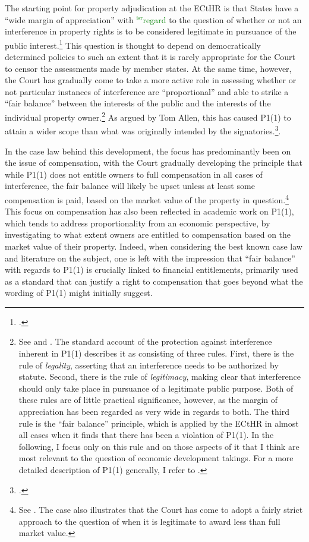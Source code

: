 \documentclass[12pt,a4paper]{book} %
\newcommand{\isr}[1]{\textcolor{green}{$^{\textrm{isr}}${#1}}}
\begin{document}
The starting point for property adjudication at the ECtHR is that States have a ``wide margin of appreciation'' with \isr{regard} to the question of whether or not an interference in property rights is to be considered legitimate in pursuance of the public interest.\footcite[See][54]{james86} This question is thought to depend on democratically determined policies to such an extent that it is rarely appropriate for the Court to censor the assessments made by member states. At the same time, however, the Court has gradually come to take a more active role in assessing whether or not particular instances of interference are ``proportional'' and able to strike a ``fair balance'' between the interests of the public and the interests of the individual property owner.\footnote{See \cite[69]{sporrong82} and \cite[120]{james86}. The standard account of the protection against interference inherent in P1(1) describes it as consisting of three rules. First, there is the rule of {\it legality}, asserting that an interference needs to be authorized by statute. Second, there is the rule of {\it legitimacy}, making clear that interference should only take place in pursuance of a legitimate public purpose. Both of these rules are of little practical significance, however, as the margin of appreciation has been regarded as very wide in regards to both. The third rule is the ``fair balance'' principle, which is applied by the ECtHR in almost all cases when it finds that there has been a violation of P1(1). In the following, I focus only on this rule and on those aspects of it that I think are most relevant to the question of economic development takings. For a more detailed description of P1(1) generally, I refer to \cite{allen05}.} As argued by Tom Allen, this has caused P1(1) to attain a wider scope than what was originally intended by the signatories.\footcite[1055]{allen10}.

In the case law behind this development, the focus has predominantly been on the issue of compensation, with the Court gradually developing the principle that while P1(1) does not entitle owners to full compensation in all cases of interference, the fair balance will likely be upset unless at least some compensation is paid, based on the market value of the property in question.\footnote{See \cite[103]{scordino06}. The case also illustrates that the Court has come to adopt a fairly strict approach to the question of when it is legitimate to award less than full market value.} This focus on compensation has also been reflected in academic work on P1(1), which tends to address proportionality from an economic perspective, by investigating to what extent owners are entitled to compensation based on the market value of their property. Indeed, when considering the best known case law and literature on the subject, one is left with the impression that ``fair balance'' with regards to P1(1) is crucially linked to financial entitlements, primarily used as a standard that can justify a right to compensation that goes beyond what the wording of P1(1) might initially suggest.
\end{document}
